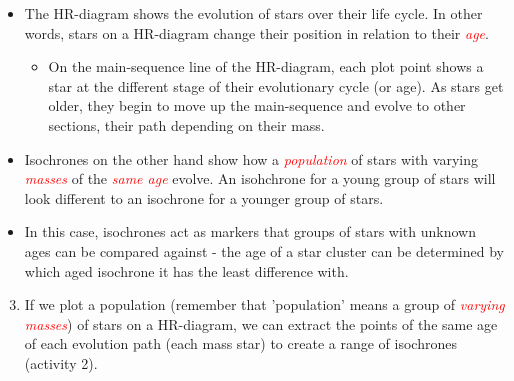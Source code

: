 \documentclass{article}
\begin{document}
    
    
    \begin{tcolorbox}[colback=white,colbacktitle=purple!75!white,colframe=purple!75!white,title=\textbf{We can use HR-diagrams of star clusters to calculate their age.}]
    
        \begin{itemize}
            \item The HR-diagram shows the evolution of stars over their life cycle. In other words, stars on a HR-diagram change their position in relation to their \emph{\textcolor{red}{age}}.
            
            
            \begin{itemize}
                \item On the main-sequence line of the HR-diagram, each plot point shows a star at the different stage of their evolutionary cycle (or age). As stars get older, they begin to move up the main-sequence and evolve to other sections, their path depending on their mass.
            \end{itemize}
            
            
            \item Isochrones on the other hand show how a \emph{\textcolor{red}{population}} of stars with varying \emph{\textcolor{red}{masses}} of the \emph{\textcolor{red}{same age}} evolve. An isohchrone for a young group of stars will look different to an isochrone for a younger group of stars.
            
            \item In this case, isochrones act as markers that groups of stars with unknown ages can be compared against - the age of a star cluster can be determined by which aged isochrone it has the least difference with.
        \end{itemize}
        
    \end{tcolorbox}



    \begin{enumerate}[label=\color{purple}\theenumi]
    \setcounter{enumi}{2}
        \item If we plot a population (remember that 'population' means a group of \emph{\textcolor{red}{varying masses}}) of stars on a HR-diagram, we can extract the points of the same age of each evolution path (each mass star) to create a range of isochrones (activity 2).
    \end{enumerate}
    
    

\end{document}
